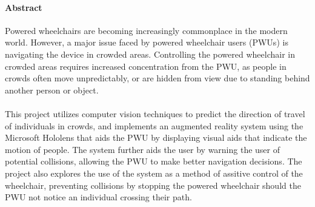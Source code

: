 \paragraph{Abstract} Powered wheelchairs are becoming increasingly commonplace in the modern world. However, a major issue faced by powered wheelchair users (PWUs) is navigating the device in crowded areas. Controlling the powered wheelchair in crowded areas requires increased concentration from the PWU, as people in crowds often move unpredictably, or are hidden from view due to standing behind another person or object.

\paragraph{}This project utilizes computer vision techniques to predict the direction of travel of individuals in crowds, and implements an augmented reality system using the Microsoft Hololens that aids the PWU by displaying visual aids that indicate the motion of people. The system further aids the user by warning the user of potential collisions, allowing the PWU to make better navigation decisions. The project also explores the use of the system as a method of assitive control of the wheelchair, preventing collisions by stopping the powered wheelchair should the PWU not notice an individual crossing their path.